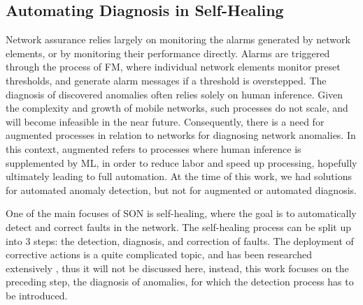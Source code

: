 		\subsection{Automating Diagnosis in Self-Healing}
			
			Network assurance relies largely on monitoring the alarms generated by network elements, or by monitoring their performance directly.
			Alarms are triggered through the process of \ac{FM}, where individual network elements monitor preset thresholds, and generate alarm messages if a threshold is overstepped.
			The diagnosis of discovered anomalies often relies solely on human inference.
			Given the complexity and growth of mobile networks, such processes do not scale, and will become infeasible in the near future.
			Consequently, there is a need for augmented processes in relation to networks for diagnosing network anomalies.
			In this context, augmented refers to processes where human inference is supplemented by \ac{ML}, in order to reduce labor and speed up processing, hopefully ultimately leading to full automation.
			At the time of this work, we had solutions for automated anomaly detection, but not for augmented or automated diagnosis.
			
			One of the main focuses of \ac{SON} is self-healing, where the goal is to automatically detect and correct faults in the network.
			The self-healing process can be split up into $3$ steps: the detection, diagnosis, and correction of faults.
			The deployment of corrective actions is a quite complicated topic, and has been researched extensively \cite{tsvetko_verif_1, tsvetko_verif_2}, thus it will not be discussed here, instead, this work focuses on the preceding step, the diagnosis of anomalies, for which the detection process has to be introduced.
			
